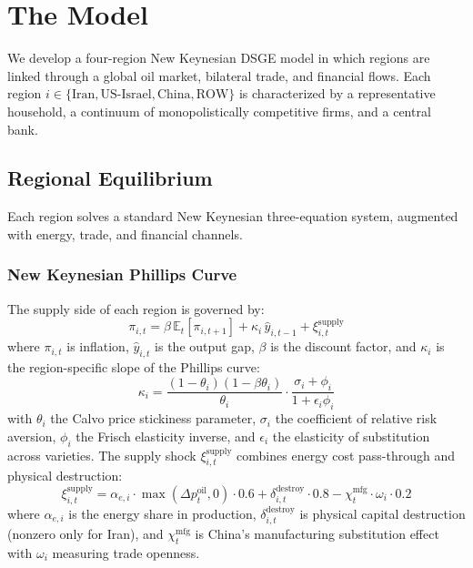 \documentclass[12pt,a4paper]{article}
\begin{document}

\section{The Model}
\label{sec:model}

We develop a four-region New Keynesian DSGE model in which regions are linked through a global oil market, bilateral trade, and financial flows. Each region $i \in \{\text{Iran}, \text{US-Israel}, \text{China}, \text{ROW}\}$ is characterized by a representative household, a continuum of monopolistically competitive firms, and a central bank.

\subsection{Regional Equilibrium}

Each region solves a standard New Keynesian three-equation system, augmented with energy, trade, and financial channels.

\subsubsection{New Keynesian Phillips Curve}

The supply side of each region is governed by:
\begin{equation}
\pi_{i,t} = \beta \, \mathbb{E}_t[\pi_{i,t+1}] + \kappa_i \, \hat{y}_{i,t-1} + \xi^{\text{supply}}_{i,t}
\label{eq:nkpc}
\end{equation}
where $\pi_{i,t}$ is inflation, $\hat{y}_{i,t}$ is the output gap, $\beta$ is the discount factor, and $\kappa_i$ is the region-specific slope of the Phillips curve:
\begin{equation}
\kappa_i = \frac{(1-\theta_i)(1-\beta\theta_i)}{\theta_i} \cdot \frac{\sigma_i + \phi_i}{1 + \epsilon_i \phi_i}
\label{eq:kappa}
\end{equation}
with $\theta_i$ the Calvo price stickiness parameter, $\sigma_i$ the coefficient of relative risk aversion, $\phi_i$ the Frisch elasticity inverse, and $\epsilon_i$ the elasticity of substitution across varieties. The supply shock $\xi^{\text{supply}}_{i,t}$ combines energy cost pass-through and physical destruction:
\begin{equation}
\xi^{\text{supply}}_{i,t} = \alpha_{e,i} \cdot \max(\Delta p^{\text{oil}}_t, 0) \cdot 0.6 + \delta^{\text{destroy}}_{i,t} \cdot 0.8 - \chi^{\text{mfg}}_t \cdot \omega_i \cdot 0.2
\label{eq:supply_shock}
\end{equation}
where $\alpha_{e,i}$ is the energy share in production, $\delta^{\text{destroy}}_{i,t}$ is physical capital destruction (nonzero only for Iran), and $\chi^{\text{mfg}}_t$ is China's manufacturing substitution effect with $\omega_i$ measuring trade openness.
\end{document}

